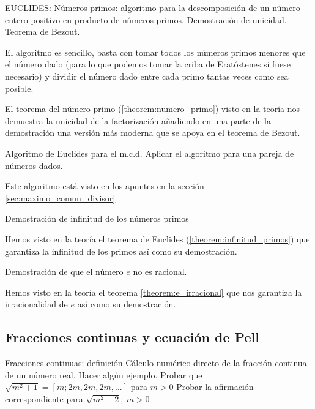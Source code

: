 \begin{problem}[23]
EUCLIDES: Números primos: algoritmo para la descomposición de un número entero positivo en producto de números primos. Demostración de unicidad. Teorema de Bezout.
\solution


El algoritmo es sencillo, basta con tomar todos los números primos menores que el número dado (para lo que podemos tomar la criba de Eratóstenes si fuese necesario) y dividir el número dado entre cada primo tantas veces como sea posible.

El teorema del número primo (\ref{theorem:numero_primo}) visto en la teoría nos demuestra la unicidad de la factorización añadiendo en una parte de la demostración una versión más moderna que se apoya en el teorema de Bezout.

\end{problem}

\begin{problem}[24]
Algoritmo de Euclides para el m.c.d. Aplicar el algoritmo para una pareja de números dados.
\solution

Este algoritmo está visto en los apuntes en la sección \ref{sec:maximo_comun_divisor}

\end{problem}

\begin{problem}[25]
Demostración de infinitud de los números primos
\solution

Hemos visto en la teoría el teorema de Euclides (\ref{theorem:infinitud_primos}) que garantiza la infinitud de los primos así como su demostración.
\end{problem}

\begin{problem}[26]
Demostración de que el número $e$ no es racional.
\solution

Hemos visto en la teoría el teorema \ref{theorem:e_irracional} que nos garantiza la irracionalidad de $e$ así como su demostración.

\end{problem}

\subsection{Fracciones continuas y ecuación de Pell}
\begin{problem}[27]
\ppart Fracciones continuas: definición
\ppart Cálculo numérico directo de la fracción continua de un número real. Hacer algún ejemplo.
\ppart Probar que $\sqrt{m^2+1}=[m;2m,2m,2m,...]$ para $m>0$
\ppart Probar la afirmación correspondiente para $\sqrt{m^2+2},\ m>0$
\solution

\end{problem}

